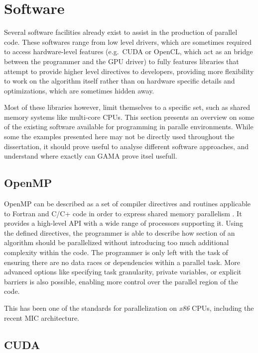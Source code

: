\documentclass[main.tex]{subfiles}
\begin{document}
\section{Software}

Several software facilities already exist to assist in the production of parallel code. These softwares range from low level drivers, which are sometimes required to access hardware-level features (e.g.\ \acs{CUDA} or \acs{OpenCL}, which act as an bridge between the programmer and the \acs{GPU} driver) to fully features libraries that attempt to provide higher level directives to developers, providing more flexibility to work on the algorithm itself rather than on hardware specific details and optimizations, which are sometimes hidden away.

Most of these libraries however, limit themselves to a specific set, such as shared memory systems like multi-core \acsp{CPU}. This section presents an overview on some of the existing software available for programming in paralle environments. While some the examples presented here may not be directly used throughout the dissertation, it should prove useful to analyse different software approaches, and understand where exactly can \acs{GAMA} prove itsel usefull.


\subsection{\acs{OpenMP}}

\ac{OpenMP} can be described as a set of compiler directives and routines applicable to Fortran and C/C+ code in order to express shared memory parallelism \cite{dagum1998openmp}. It provides a high-level API with a wide range of processors supporting it.
Using the defined directives, the programmer is able to describe how section of an algorithm should be parallelized without introducing too much additional complexity within the code. The programmer is only left with the task of ensuring there are no data races or dependencies within a parallel task. More advanced options like specifying task granularity, private variables, or explicit barriers is also possible, enabling more control over the parallel region of the code.

This has been one of the standards for parallelization on \textit{x86} \acsp{CPU}, including the recent \intel \acf{MIC} architecture.

\subsection{\acs{CUDA}}
\end{document}
